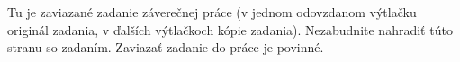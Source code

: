 Tu je zaviazané zadanie  záverečnej práce (v jednom odovzdanom výtlačku originál zadania, v ďalších výtlačkoch kópie zadania). Nezabudnite nahradiť túto stranu so zadaním. Zaviazať zadanie do práce je povinné.

\cleardoublepage
